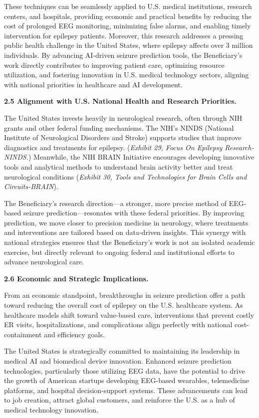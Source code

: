 \documentclass{article}
\begin{document}
These techniques can be seamlessly applied to U.S. medical institutions, research centers, and hospitals, providing economic and practical benefits by reducing the cost of prolonged EEG monitoring, minimizing false alarms, and enabling timely intervention for epilepsy patients. Moreover, this research addresses a pressing public health challenge in the United States, where epilepsy affects over 3 million individuals. By advancing AI-driven seizure prediction tools, the Beneficiary’s work directly contributes to improving patient care, optimizing resource utilization, and fostering innovation in U.S. medical technology sectors, aligning with national priorities in healthcare and AI development.

{\bf 2.5 Alignment with U.S. National Health and Research Priorities. }

The United States invests heavily in neurological research, often through NIH grants and other federal funding mechanisms. The NIH’s NINDS (National Institute of Neurological Disorders and Stroke) supports studies that improve diagnostics and treatments for epilepsy. ({\it Exhibit 29, Focus On Epilepsy Research-NINDS.}) Meanwhile, the NIH BRAIN Initiative encourages developing innovative tools and analytical methods to understand brain activity better and treat neurological conditions ({\it Exhibit 30, Tools and Technologies for Brain Cells and Circuits-BRAIN}).

The Beneficiary’s research direction—a stronger, more precise method of EEG-based seizure prediction—resonates with these federal priorities. By improving prediction, we move closer to precision medicine in neurology, where treatments and interventions are tailored based on data-driven insights. This synergy with national strategies ensures that the Beneficiary’s work is not an isolated academic exercise, but directly relevant to ongoing federal and institutional efforts to advance neurological care.


{\bf 2.6 Economic and Strategic Implications. }

From an economic standpoint, breakthroughs in seizure prediction offer a path toward reducing the overall cost of epilepsy on the U.S. healthcare system. As healthcare models shift toward value-based care, interventions that prevent costly ER visits, hospitalizations, and complications align perfectly with national cost-containment and efficiency goals.

The United States is strategically committed to maintaining its leadership in medical AI and biomedical device innovation. Enhanced seizure prediction technologies, particularly those utilizing EEG data, have the potential to drive the growth of American startups developing EEG-based wearables, telemedicine platforms, and hospital decision-support systems. These advancements can lead to job creation, attract global customers, and reinforce the U.S. as a hub of medical technology innovation.
\end{document}
